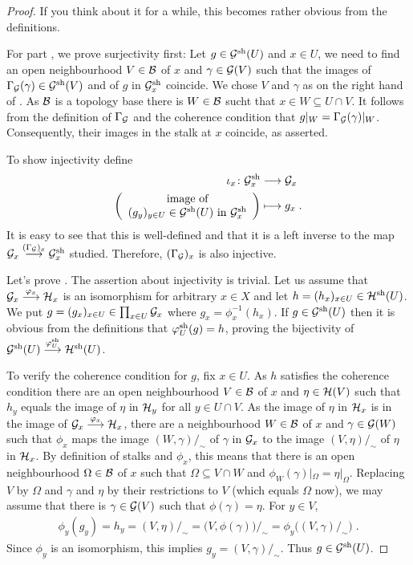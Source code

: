 \documentclass[a4paper,parskip=half,numbers=enddot, DIV=12]{scrreprt}
\begin{document}
\begin{proof}
	 If you think about it for a while, this becomes rather obvious from the definitions.
	
	For part , we prove surjectivity first: Let $g\in\mathcal{G}^{\mathrm{sh}}(U)$ and $x\in U$, we need to find an open neighbourhood $V\in \mathcal{B}$ of $x$ and $\gamma\in \mathcal{G}(V)$ such that the images of $\Gamma_{\mathcal{G}}(\gamma)\in \mathcal{G}^{\mathrm{sh}}(V)$ and of $g$ in $\mathcal{G}^{\mathrm{sh}}_x$ coincide. We chose $V$ and $\gamma$ as on the right hand of . As $\mathcal{B}$ is a topology base there is $W\in\mathcal{B}$ sucht that $x\in W\subseteq U\cap V$. It follows from the definition of $\Gamma_{\mathcal{G}}$ and the coherence condition that $g|_W = \Gamma_{\mathcal{G}}(\gamma)|_W$. Consequently, their images in the stalk at $x$ coincide, as asserted.
	
	To show injectivity define
	\begin{align*}
	    \iota_x\colon \Gg^\sh_x &\morphism \Gg_x\\
	    \bigg(\begin{array}{c}
		    \text{image of}\\
		    (g_y)_{y\in U} \in \Gg^\sh(U) \text{ in } \Gg^\sh_x 
	    \end{array}\bigg) &\longmapsto g_x\;.
	\end{align*}
	It is easy to see that this is well-defined and that it is a left inverse to the map $\Gg_x\morphism[(\Gamma_{\Gg})_x] \Gg^\sh_x$ studied. Therefore, $(\Gamma_{\mathcal{G}})_x$  is also injective.
	
	Let's prove . The assertion about injectivity is trivial. Let us assume that $\Gg_x\morphism[\phi_x]\Hh_x$ is an isomorphism for arbitrary $x\in X$ and let $h=(h_x)_{x\in U}\in \mathcal{H}^{\mathrm{sh}}(U)$. We put $g=(g_x)_{x\in U} \in \prod_{x\in U}\mathcal{G}_x$ where $g_x = \phi_x^{-1} (h_x)$. If $g\in \mathcal{G}^{\mathrm{sh}}(U)$ then it is obvious from the definitions that $\varphi_U^{\mathrm{sh}}(g) = h$, proving the bijectivity of $\Gg^\sh(U) \morphism[\phi_U^\sh] \Hh^\sh(U)$.
	
	To verify the coherence condition for $g$, fix $x\in U$. As $h$ satisfies the coherence condition there are an open neighbourhood $V\in\mathcal{B}$ of $x$ and $\eta\in\mathcal{H}(V)$ such that $h_y$ equals the image of $\eta$ in $\mathcal{H}_y$ for all $y\in U\cap V$. As the image of $\eta$ in $\mathcal{H}_x$ is in the image of $\Gg_x\morphism[\phi_x]\Hh_x$, there are a neighbourhood $W\in\mathcal{B}$ of $x$ and $\gamma\in\mathcal{G}(W)$ such that $\phi_x$ maps the image $(W,\gamma)/_\sim$ of $\gamma$ in $\mathcal{G}_x$ to the image $(V,\eta)/_\sim$ of $\eta$ in $\mathcal{H}_x$. By definition of stalks and $\phi_x$, this means that there is an open neighbourhood $\Omega\in\mathcal{B}$ of $x$ such that $\Omega\subseteq V\cap W$ and $ \phi_W(\gamma)|_\Omega = \eta|_\Omega$. Replacing $V$ by $\Omega$ and $\gamma$ and $\eta$ by their restrictions to $V$ (which equals $\Omega$ now), we may assume that there is $\gamma\in\mathcal{G}(V)$ such that $\phi(\gamma) = \eta$. For $y\in V$, \begin{align*}
		\phi_y(g_y) = h_y=(V,\eta)/_\sim = \big(V,\phi(\gamma)\big)/_\sim = \phi_y\big((V,\gamma)/_\sim\big)\;.
	\end{align*}
	Since $\phi_y$ is an isomorphism, this implies $g_y = (V,\gamma)/_\sim$. Thus $g\in \mathcal{G}^{\mathrm{sh}}(U)$.
	

\end{proof}
\end{document}
